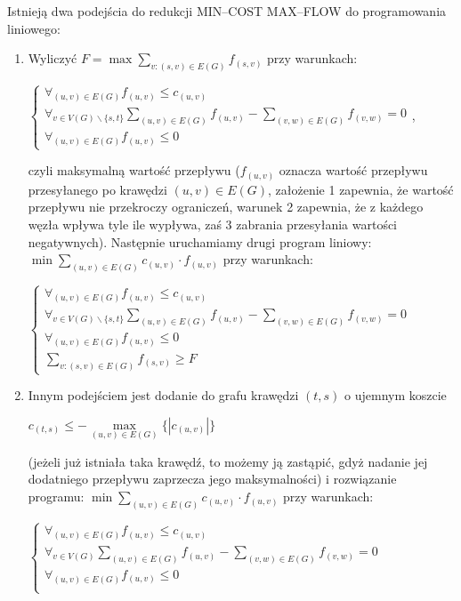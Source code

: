 \documentclass[licencjacka]{pracamgr}
\begin{document}
Istnieją dwa podejścia do redukcji MIN--COST MAX--FLOW do programowania liniowego:
\begin{enumerate}
\item Wyliczyć $F=\max \sum\limits_{v: (s,v)\in E(G)}f_{(s,v)}$ przy warunkach:\newline
\centerline{$\left\{\begin{array}{c}
\forall_{(u,v)\in E(G)} f_{(u,v)}\le c_{(u,v)}\\
\forall_{v\in V(G)\backslash\{s,t\}}\sum\limits_{(u,v)\in E(G)}f_{(u,v)}-\sum\limits_{(v,w)\in E(G)}f_{(v,w)}=0\\
\forall_{(u,v)\in E(G)} f_{(u,v)}\le 0
\end{array}\right.$,}\newline
czyli maksymalną wartość przepływu ($f_{(u,v)}$ oznacza wartość przepływu przesyłanego po krawędzi $(u,v)\in E(G)$,
założenie 1 zapewnia, że wartość przepływu nie przekroczy ograniczeń, warunek 2 zapewnia, że z każdego węzła wpływa tyle ile wypływa, zaś 3 zabrania przesyłania wartości negatywnych).
Następnie uruchamiamy drugi program liniowy: $\min \sum\limits_{(u,v)\in E(G)}c_{(u,v)}\cdot f_{(u,v)}$ przy warunkach:\newline
\centerline{$\left\{\begin{array}{c}
\forall_{(u,v)\in E(G)} f_{(u,v)}\le c_{(u,v)}\\
\forall_{v\in V(G)\backslash\{s,t\}}\sum\limits_{(u,v)\in E(G)}f_{(u,v)}-\sum\limits_{(v,w)\in E(G)}f_{(v,w)}=0\\
\forall_{(u,v)\in E(G)} f_{(u,v)}\le 0\\
\sum\limits_{v: (s,v)\in E(G)}f_{(s,v)}\ge F
\end{array}\right.$}
%
\item Innym podejściem jest dodanie do grafu krawędzi $(t,s)$ o ujemnym koszcie\newline
\centerline{$c_{(t,s)}\le-\max\limits_{(u,v)\in E(G)}\{|c_{(u,v)}|\}$}\newline
(jeżeli już istniała taka krawędź, to możemy ją zastąpić, gdyż nadanie jej dodatniego przepływu zaprzecza jego maksymalności) i rozwiązanie programu:\newline
$\min \sum\limits_{(u,v)\in E(G)}c_{(u,v)}\cdot f_{(u,v)}$ przy warunkach:\newline
\centerline{$\left\{\begin{array}{c}
\forall_{(u,v)\in E(G)} f_{(u,v)}\le c_{(u,v)}\\
\forall_{v\in V(G)}\sum\limits_{(u,v)\in E(G)}f_{(u,v)}-\sum\limits_{(v,w)\in E(G)}f_{(v,w)}=0\\
\forall_{(u,v)\in E(G)} f_{(u,v)}\le 0\\
\end{array}\right.$}
\end{enumerate}
%
\end{document}
